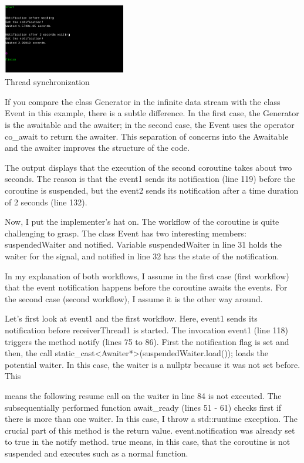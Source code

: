 \begin{center}
\includegraphics[width=0.4\textwidth]{content/3/chapter6/images/6.png}\\
Thread synchronization
\end{center}

If you compare the class Generator in the infinite data stream with the class Event in this example, there is a subtle difference. In the first case, the Generator is the awaitable and the awaiter; in the second case, the Event uses the operator co\_await to return the awaiter. This separation of concerns into the Awaitable and the awaiter improves the structure of the code.

The output displays that the execution of the second coroutine takes about two seconds. The reason is that the event1 sends its notification (line 119) before the coroutine is suspended, but the event2 sends its notification after a time duration of 2 seconds (line 132).

Now, I put the implementer’s hat on. The workflow of the coroutine is quite challenging to grasp. The class Event has two interesting members: suspendedWaiter and notified. Variable suspendedWaiter in line 31 holds the waiter for the signal, and notified in line 32 has the state of the notification.

In my explanation of both workflows, I assume in the first case (first workflow) that the event notification happens before the coroutine awaits the events. For the second case (second workflow), I assume it is the other way around.

Let’s first look at event1 and the first workflow. Here, event1 sends its notification before receiverThread1 is started. The invocation event1 (line 118) triggers the method notify (lines 75 to 86). First the notification flag is set and then, the call static\_cast<Awaiter*>(suspendedWaiter.load()); loads the potential waiter. In this case, the waiter is a nullptr because it was not set before. This

means the following resume call on the waiter in line 84 is not executed. The subsequentially performed function await\_ready (lines 51 - 61) checks first if there is more than one waiter. In this case, I throw a std::runtime exception. The crucial part of this method is the return value. event.notification was already set to true in the notify method. true means, in this case, that the coroutine is not suspended and executes such as a normal function.

